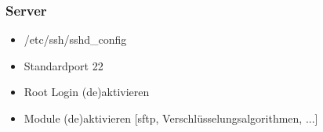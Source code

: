 \begin{frame}
\frametitle{Server}
\begin{itemize}
\item /etc/ssh/sshd\_config
\item Standardport 22
\item Root Login (de)aktivieren
\item Module (de)aktivieren [sftp, Verschlüsselungsalgorithmen, ...]
\end{itemize}
\end{frame}